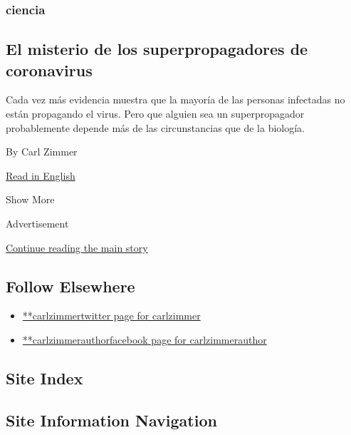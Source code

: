 \begin{enumerate}
  \hypertarget{ciencia-1}{%
  \subsubsection{ciencia}\label{ciencia-1}}

  \hypertarget{el-misterio-de-los-superpropagadores-de-coronavirus}{%
  \subsection{El misterio de los superpropagadores de
  coronavirus}\label{el-misterio-de-los-superpropagadores-de-coronavirus}}

  Cada vez más evidencia muestra que la mayoría de las personas
  infectadas no están propagando el virus. Pero que alguien sea un
  superpropagador probablemente depende más de las circunstancias que de
  la biología.

  By Carl Zimmer

  \href{https://www.nytimes.com/2020/06/30/science/how-coronavirus-spreads.html}{Read
  in English}
\end{enumerate}

Show More

Advertisement

\protect\hyperlink{after-mid2}{Continue reading the main story}

\hypertarget{follow-elsewhere}{%
\subsection{Follow Elsewhere}\label{follow-elsewhere}}

\begin{itemize}
\tightlist
\item
  \href{https://twitter.com/carlzimmer}{**carlzimmertwitter page for
  carlzimmer}
\item
  \href{https://www.facebook.com/carlzimmerauthor}{**carlzimmerauthorfacebook
  page for carlzimmerauthor}
\end{itemize}

\hypertarget{site-index}{%
\subsection{Site Index}\label{site-index}}

\hypertarget{site-information-navigation}{%
\subsection{Site Information
Navigation}\label{site-information-navigation}}

